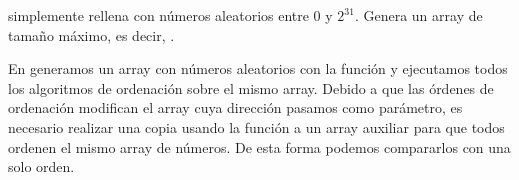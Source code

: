 
 simplemente rellena  con números aleatorios entre 0 y \(2^{31}\). Genera un array de tamaño máximo, es decir, .


En  generamos un array con números aleatorios con la función  y ejecutamos todos los algoritmos de ordenación sobre el mismo array. Debido a que las órdenes de ordenación modifican el array cuya dirección pasamos como parámetro, es necesario realizar una copia usando la función  a un array auxiliar para que todos ordenen el mismo array de números. De esta forma podemos compararlos con una solo orden.


